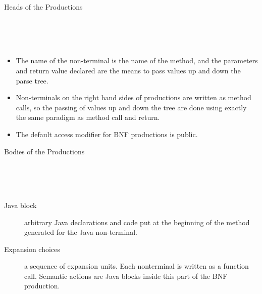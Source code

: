 \begin{bibunit}[apalike]
\begin{frame}[t]{Heads of the Productions}
	\begin{definition}\small
		 \\
		 \\
		 \\
	\end{definition}
	\begin{itemize}
	\item The name of the non-terminal is the name of the method, and the parameters and return value declared are the means to pass values up and down the parse tree.
	\item Non-terminals on the right hand sides of productions are written as method calls, so the passing of values up and down the tree are done using exactly the same paradigm as method call and return.
	\item The default access modifier for BNF productions is public.
	\end{itemize}
\end{frame}

\begin{frame}[t]{Bodies of the Productions}
	\begin{definition}\small
		 \\
		 \\
		 \\
	\end{definition}
	\begin{description}
	\item[Java block] arbitrary Java declarations and code put at the beginning of the method generated for the Java non-terminal.
	\item[Expansion choices] a sequence of expansion units. Each nonterminal is written as a function call. Semantic actions are Java blocks inside this part of the BNF production.
	\end{description}
\end{frame}


\end{bibunit}
